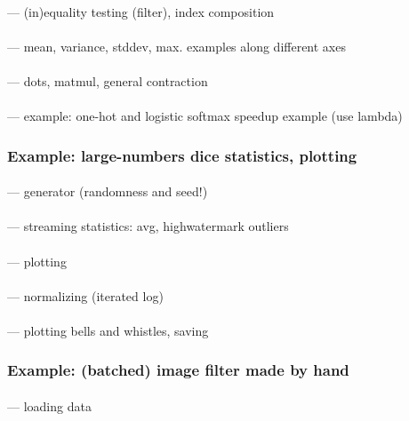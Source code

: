 \documentclass[12pt]{article}
\begin{document}
        \paragraph{\sf} --- (in)equality testing (filter), index composition
        \paragraph{\sf} --- mean, variance, stddev, max.  examples along different axes
        \paragraph{\sf} --- dots, matmul, general contraction
        \paragraph{\sf} --- example: one-hot and logistic softmax speedup example (use lambda)

      \subsubsection*{Example: large-numbers dice statistics, plotting}
        \paragraph{\sf} --- generator (randomness and seed!)
        \paragraph{\sf} --- streaming statistics: avg, highwatermark outliers
        \paragraph{\sf} --- plotting
        \paragraph{\sf} --- normalizing (iterated log)
        \paragraph{\sf} --- plotting bells and whistles, saving

      \subsubsection*{Example: (batched) image filter made by hand}
        \paragraph{\sf} --- loading data
\end{document}
